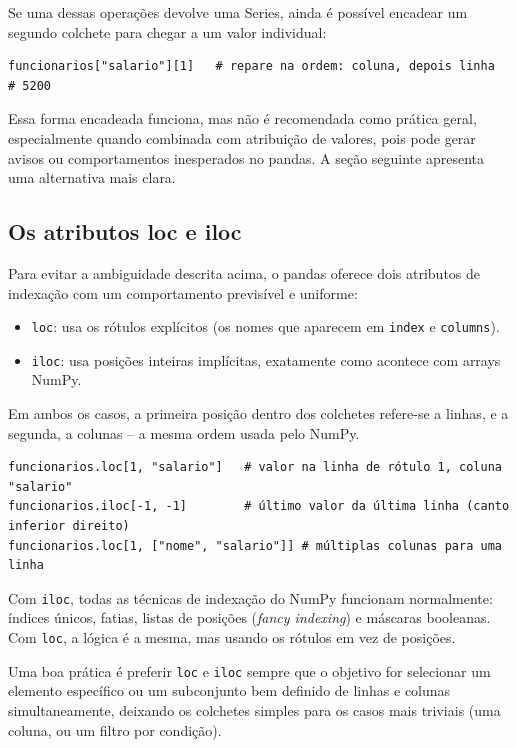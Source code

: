 \documentclass[11pt,a4paper]{article}
\begin{document}
Se uma dessas operações devolve uma Series, ainda é possível encadear um segundo colchete para chegar a um valor individual:
\begin{lstlisting}
funcionarios["salario"][1]   # repare na ordem: coluna, depois linha
# 5200
\end{lstlisting}

Essa forma encadeada funciona, mas não é recomendada como prática geral, especialmente quando combinada com atribuição de valores, pois pode gerar avisos ou comportamentos inesperados no pandas. A seção seguinte apresenta uma alternativa mais clara.

\subsection{Os atributos loc e iloc}

Para evitar a ambiguidade descrita acima, o pandas oferece dois atributos de indexação com um comportamento previsível e uniforme:
\begin{itemize}
    \item \texttt{loc}: usa os rótulos explícitos (os nomes que aparecem em \texttt{index} e \texttt{columns}).
    \item \texttt{iloc}: usa posições inteiras implícitas, exatamente como acontece com arrays NumPy.
\end{itemize}

Em ambos os casos, a primeira posição dentro dos colchetes refere-se a linhas, e a segunda, a colunas -- a mesma ordem usada pelo NumPy.

\begin{lstlisting}
funcionarios.loc[1, "salario"]   # valor na linha de rótulo 1, coluna "salario"
funcionarios.iloc[-1, -1]        # último valor da última linha (canto inferior direito)
funcionarios.loc[1, ["nome", "salario"]] # múltiplas colunas para uma linha
\end{lstlisting}

Com \texttt{iloc}, todas as técnicas de indexação do NumPy funcionam normalmente: índices únicos, fatias, listas de posições (\textit{fancy indexing}) e máscaras booleanas. Com \texttt{loc}, a lógica é a mesma, mas usando os rótulos em vez de posições.

Uma boa prática é preferir \texttt{loc} e \texttt{iloc} sempre que o objetivo for selecionar um elemento específico ou um subconjunto bem definido de linhas e colunas simultaneamente, deixando os colchetes simples para os casos mais triviais (uma coluna, ou um filtro por condição).
\end{document}
